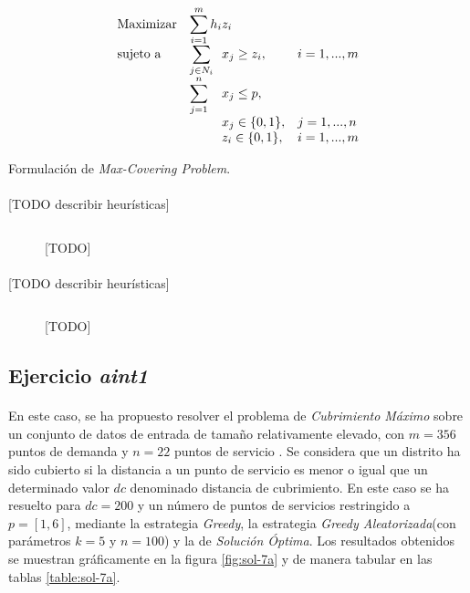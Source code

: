 \documentclass[spanish]{article}
\begin{document}
		\begin{eqfloat}
			\begin{equation}
				\begin{array}{ll@{}ll}
					\text{Maximizar}
						& \displaystyle\sum\limits_{i = 1}^{m} h_{i} & z_{i} 			&							\\
					\text{sujeto a}
						& \displaystyle\sum\limits_{j \in N_i}& x_{j} \geq z_i,		&i=1 ,..., m	\\
						& \displaystyle\sum\limits_{j = 1}^n 	& x_{j} \leq p,  		& 						\\
						&                                     &	x_{j} \in \{0,1\},&j=1 ,..., n 	\\
						&                                     &	z_{i} \in \{0,1\},&i=1 ,..., m  \\
				\end{array}
			\end{equation}
			\caption{Formulación de \emph{Max-Covering Problem}.}
			\label{eq:max_covering}
		\end{eqfloat}

		\paragraph{}
		[TODO describir heurísticas]

		\begin{figure}[h]
			\centering
			\inputminted{basic}{./code/set-covering-greedy.mos}
			\caption{[TODO]}
			\label{}
		\end{figure}

		\paragraph{}
		[TODO describir heurísticas]

		\begin{figure}[h]
			\centering
			\inputminted{basic}{./code/random-greedy.mos}
			\caption{[TODO]}
			\label{}
		\end{figure}

		\subsection{Ejercicio \emph{aint1}}
		\label{sec:e-7a}

			\paragraph{}
			En este caso, se ha propuesto resolver el problema de \emph{Cubrimiento Máximo} sobre un conjunto de datos de entrada de tamaño relativamente elevado, con $m = 356$ puntos de demanda y $n=22$ puntos de servicio . Se considera que un distrito ha sido cubierto si la distancia a un punto de servicio es menor o igual que un determinado valor $dc$ denominado distancia de cubrimiento. En este caso se ha resuelto para $dc = 200$ y un número de puntos de servicios restringido a $p = [1,6]$, mediante la estrategia \emph{Greedy}, la estrategia \emph{Greedy Aleatorizada}(con parámetros $k=5$ y $n=100$) y la de \emph{Solución Óptima}. Los resultados obtenidos se muestran gráficamente en la figura \ref{fig:sol-7a} y de manera tabular en las tablas \ref{table:sol-7a}.
\end{document}
